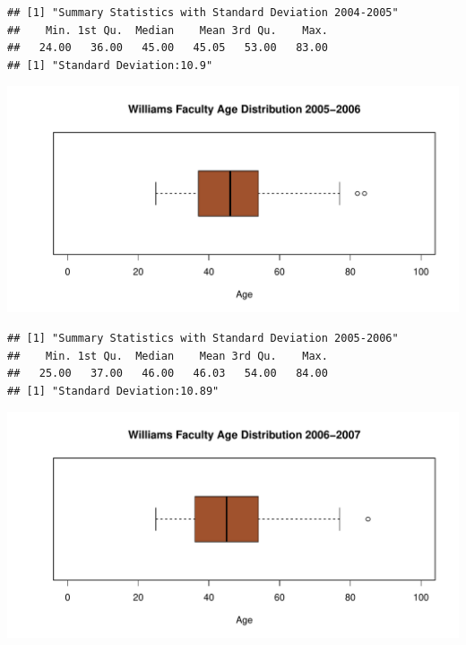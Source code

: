 \documentclass[12pt,a4paper]{article}\usepackage[]{graphicx}\usepackage[]{color}
\makeatletter
\def\maxwidth{ %
  \ifdim\Gin@nat@width>\linewidth
    \linewidth
  \else
    \Gin@nat@width
  \fi
}
\newenvironment{kframe}{%
 \def\at@end@of@kframe{}%
 \ifinner\ifhmode%
  \def\at@end@of@kframe{\end{minipage}}%
  \begin{minipage}{\columnwidth}%
 \fi\fi%
 \def\FrameCommand##1{\hskip\@totalleftmargin \hskip-\fboxsep
 \colorbox{shadecolor}{##1}\hskip-\fboxsep
     \hskip-\linewidth \hskip-\@totalleftmargin \hskip\columnwidth}%
 \MakeFramed {\advance\hsize-\width
   \@totalleftmargin\z@ \linewidth\hsize
   \@setminipage}}%
 {\par\unskip\endMakeFramed%
 \at@end@of@kframe}
\newenvironment{knitrout}{}{} %
\theoremstyle{definition}
\makeatother
\begin{document}
\begin{knitrout}
\color{fgcolor}\begin{kframe}
\begin{verbatim}
## [1] "Summary Statistics with Standard Deviation 2004-2005"
##    Min. 1st Qu.  Median    Mean 3rd Qu.    Max. 
##   24.00   36.00   45.00   45.05   53.00   83.00
## [1] "Standard Deviation:10.9"
\end{verbatim}
\end{kframe}
\end{knitrout}

\begin{knitrout}
\color{fgcolor}
\includegraphics[width=\maxwidth]{figure/unnamed-chunk-16-1} 

\end{knitrout}

\begin{knitrout}
\color{fgcolor}\begin{kframe}
\begin{verbatim}
## [1] "Summary Statistics with Standard Deviation 2005-2006"
##    Min. 1st Qu.  Median    Mean 3rd Qu.    Max. 
##   25.00   37.00   46.00   46.03   54.00   84.00
## [1] "Standard Deviation:10.89"
\end{verbatim}
\end{kframe}
\end{knitrout}


\begin{knitrout}
\color{fgcolor}
\includegraphics[width=\maxwidth]{figure/unnamed-chunk-18-1} 

\end{knitrout}
\end{document}

